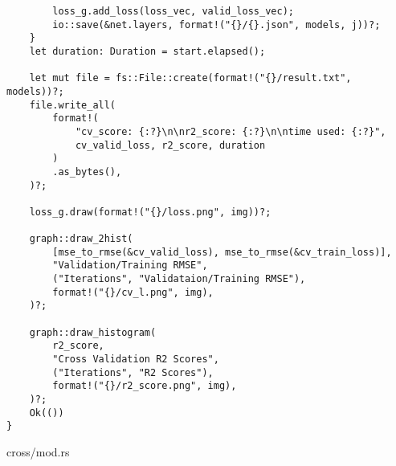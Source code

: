 \begin{verbatim}
        loss_g.add_loss(loss_vec, valid_loss_vec);
        io::save(&net.layers, format!("{}/{}.json", models, j))?;
    }
    let duration: Duration = start.elapsed();

    let mut file = fs::File::create(format!("{}/result.txt", models))?;
    file.write_all(
        format!(
            "cv_score: {:?}\n\nr2_score: {:?}\n\ntime used: {:?}",
            cv_valid_loss, r2_score, duration
        )
        .as_bytes(),
    )?;

    loss_g.draw(format!("{}/loss.png", img))?;

    graph::draw_2hist(
        [mse_to_rmse(&cv_valid_loss), mse_to_rmse(&cv_train_loss)],
        "Validation/Training RMSE",
        ("Iterations", "Validataion/Training RMSE"),
        format!("{}/cv_l.png", img),
    )?;

    graph::draw_histogram(
        r2_score,
        "Cross Validation R2 Scores",
        ("Iterations", "R2 Scores"),
        format!("{}/r2_score.png", img),
    )?;
    Ok(())
}
\end{verbatim}
\noindent cross/mod.rs
